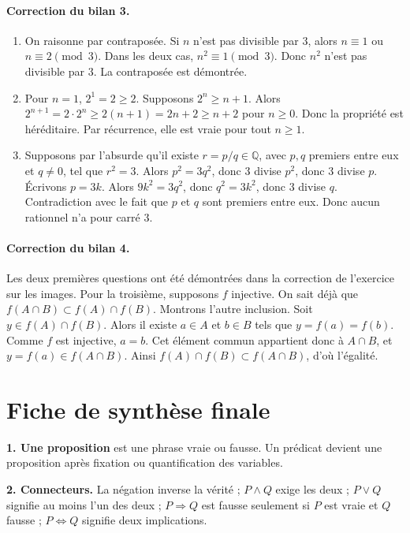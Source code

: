 \documentclass[11pt,a4paper]{article}
\newcommand{\Q}{\mathbb{Q}}
\begin{document}
\paragraph{Correction du bilan 3.}
\begin{enumerate}
  \item On raisonne par contraposée. Si $n$ n'est pas divisible par $3$, alors $n\equiv1$ ou $n\equiv2\pmod 3$. Dans les deux cas, $n^2\equiv1\pmod3$. Donc $n^2$ n'est pas divisible par $3$. La contraposée est démontrée.
  \item Pour $n=1$, $2^1=2\geq2$. Supposons $2^n\geq n+1$. Alors $2^{n+1}=2\cdot2^n\geq2(n+1)=2n+2\geq n+2$ pour $n\geq0$. Donc la propriété est héréditaire. Par récurrence, elle est vraie pour tout $n\geq1$.
  \item Supposons par l'absurde qu'il existe $r=p/q\in\Q$, avec $p,q$ premiers entre eux et $q\neq0$, tel que $r^2=3$. Alors $p^2=3q^2$, donc $3$ divise $p^2$, donc $3$ divise $p$. Écrivons $p=3k$. Alors $9k^2=3q^2$, donc $q^2=3k^2$, donc $3$ divise $q$. Contradiction avec le fait que $p$ et $q$ sont premiers entre eux. Donc aucun rationnel n'a pour carré $3$.
\end{enumerate}

\paragraph{Correction du bilan 4.}
Les deux premières questions ont été démontrées dans la correction de l'exercice sur les images. Pour la troisième, supposons $f$ injective. On sait déjà que $f(A\cap B)\subset f(A)\cap f(B)$. Montrons l'autre inclusion. Soit $y\in f(A)\cap f(B)$. Alors il existe $a\in A$ et $b\in B$ tels que $y=f(a)=f(b)$. Comme $f$ est injective, $a=b$. Cet élément commun appartient donc à $A\cap B$, et $y=f(a)\in f(A\cap B)$. Ainsi $f(A)\cap f(B)\subset f(A\cap B)$, d'où l'égalité.

\section{Fiche de synthèse finale}

\begin{retenirbox}
\textbf{1. Une proposition} est une phrase vraie ou fausse. Un prédicat devient une proposition après fixation ou quantification des variables.
\end{retenirbox}

\begin{retenirbox}
\textbf{2. Connecteurs.} La négation inverse la vérité ; $P\land Q$ exige les deux ; $P\lor Q$ signifie au moins l'un des deux ; $P\Rightarrow Q$ est fausse seulement si $P$ est vraie et $Q$ fausse ; $P\Longleftrightarrow Q$ signifie deux implications.
\end{retenirbox}
\end{document}
